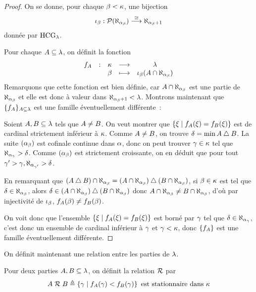 \begin{proof}
  On se donne, pour chaque $\beta < \kappa$, une bijection
  \[\iota_\beta : \displaystyle \mathcal{P}(\aleph_{\alpha_\beta}) \overset{\cong}{\longrightarrow} \aleph_{\alpha_\beta + 1}\]
  donnée par $\operatorname{HCG}_\lambda$.

  Pour chaque $A\subseteq \lambda$, on définit la fonction
  \[\makeFun{f_{\varPt}}{\varCk}{\varCCl}{\varOb}
            {\iota_\varOb(\varPt\cap\Cal_{\varOa_\varOb})}\]
  Remarquons que cette fonction est bien définie, car
  $A\cap \aleph_{\alpha_\beta}$ est une partie de $\aleph_{\alpha_\beta}$ et elle est
  donc à valeur dans $\aleph_{\alpha_\beta + 1} < \lambda$. Montrons maintenant que
  $\{f_{A}\}_{A\subseteq \lambda}$ est une famille éventuellement
  différente~:

  Soient $A,B\subseteq \lambda$ tels que $A\neq B$. On
  veut montrer que $\left\{ \xi \;\middle\vert\; f_{A}(\xi) = f_{B}(\xi) \right\}$ est
  de cardinal strictement inférieur à $\kappa$. Comme $A\neq B$, on
  trouve $\delta = \min A \mathbin{\triangle} B$. La suite
  $(\alpha_\beta)$ est cofinale continue dans $\alpha$, donc on peut trouver
  $\gamma\in \kappa$ tel que $\aleph_{\alpha_\gamma} > \delta$. Comme $(\alpha_\beta)$
  est strictement croissante, on en déduit que pour tout
  $\gamma' > \gamma, \aleph_{\alpha_{\gamma'}} > \delta$.

  En remarquant que
  $(A\mathbin{\triangle} B) \cap \aleph_{\alpha_\beta} =
  (A\cap \aleph_{\alpha_\beta})\mathbin{\triangle} (B\cap \aleph_{\alpha_\beta})$,
  si $\beta \in \kappa$ est tel que $\delta \in \aleph_{\alpha_\beta}$, alors
  $\delta\in(A\cap \aleph_{\alpha_\beta})\mathbin{\triangle}(B\cap \aleph_{\alpha_\beta})$
  donc $A\cap \aleph_{\alpha_\beta}\neq B\cap \aleph_{\alpha_\beta}$,
  d'où par injectivité de $\iota_\beta$,
  $f_{A}(\beta) \neq f_{B}(\beta)$.

  On voit donc que l'ensemble
  $\left\{ \xi \;\middle\vert\; f_{A}(\xi) = f_{B}(\xi) \right\}$ est borné par
  $\gamma$ tel que $\delta \in \aleph_{\alpha_{\gamma}}$, c'est donc un ensemble de
  cardinal inférieur à $\gamma$ et $\gamma < \kappa$, donc $\{f_{A}\}$ est une
  famille éventuellement différente.
\end{proof}

\noindent
On définit maintenant une relation entre les parties de $\lambda$.

\begin{definition}
  Pour deux parties $A,B\subseteq \lambda$, on définit la relation
  $\mathrel{\mathcal{R}}$ par
  \[A \mathrel{\mathcal{R}} B\triangleq
  \left\{ \gamma \;\middle\vert\; f_{A}(\gamma) < f_{B}(\gamma) \right\}
  \text{ est stationnaire dans }\kappa\]
\end{definition}

